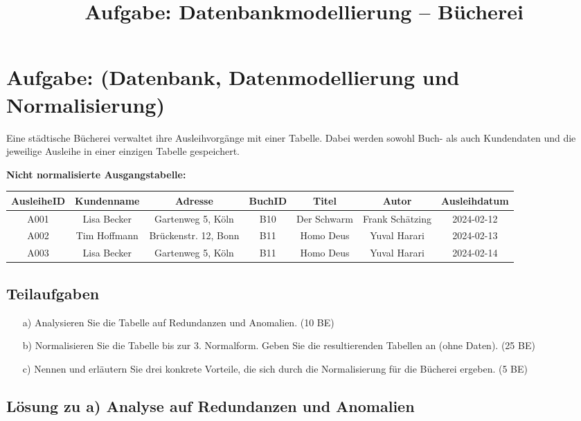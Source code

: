 \documentclass{article}
\title{Aufgabe: Datenbankmodellierung – Bücherei}
\author{}
\date{}
\begin{document}
	\maketitle
	
	\section*{Aufgabe: (Datenbank, Datenmodellierung und Normalisierung)}
	
	Eine städtische Bücherei verwaltet ihre Ausleihvorgänge mit einer Tabelle. Dabei werden sowohl Buch- als auch Kundendaten und die jeweilige Ausleihe in einer einzigen Tabelle gespeichert.
	
	\textbf{Nicht normalisierte Ausgangstabelle:}
	
	\begin{table}[h]
		\centering
		\renewcommand{\arraystretch}{1.2}
		\begin{tabular}{|c|c|c|c|c|c|c|}
			\hline
			AusleiheID & Kundenname & Adresse & BuchID & Titel & Autor & Ausleihdatum \\
			\hline
			A001 & Lisa Becker & Gartenweg 5, Köln & B10 & Der Schwarm & Frank Schätzing & 2024-02-12 \\
			A002 & Tim Hoffmann & Brückenstr. 12, Bonn & B11 & Homo Deus & Yuval Harari & 2024-02-13 \\
			A003 & Lisa Becker & Gartenweg 5, Köln & B11 & Homo Deus & Yuval Harari & 2024-02-14 \\
			\hline
		\end{tabular}
	\end{table}
	
	\subsection*{Teilaufgaben}
	
	\begin{enumerate}
		\item[a)] Analysieren Sie die Tabelle auf Redundanzen und Anomalien. (10 BE)
		\item[b)] Normalisieren Sie die Tabelle bis zur 3. Normalform. Geben Sie die resultierenden Tabellen an (ohne Daten). (25 BE)
		\item[c)] Nennen und erläutern Sie drei konkrete Vorteile, die sich durch die Normalisierung für die Bücherei ergeben. (5 BE)
	\end{enumerate}
	
	
		
	\subsection*{Lösung zu a) Analyse auf Redundanzen und Anomalien}
	
\end{document}
